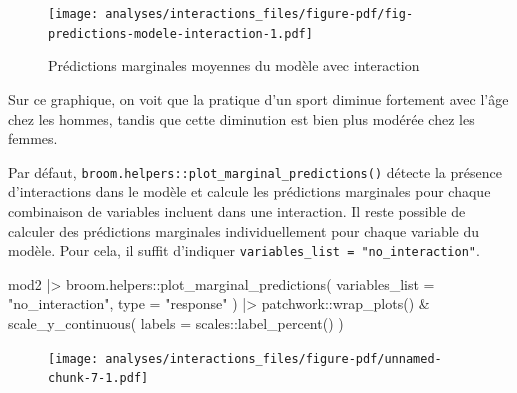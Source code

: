 \documentclass[
  letterpaper,
  DIV=11,
  numbers=noendperiod,
  oneside]{scrreprt}
\newenvironment{Shaded}{\begin{snugshade}}{\end{snugshade}}
\newcommand{\AttributeTok}[1]{\textcolor[rgb]{0.40,0.45,0.13}{#1}}
\newcommand{\FunctionTok}[1]{\textcolor[rgb]{0.28,0.35,0.67}{#1}}
\newcommand{\NormalTok}[1]{\textcolor[rgb]{0.00,0.23,0.31}{#1}}
\newcommand{\SpecialCharTok}[1]{\textcolor[rgb]{0.37,0.37,0.37}{#1}}
\newcommand{\StringTok}[1]{\textcolor[rgb]{0.13,0.47,0.30}{#1}}
\begin{document}
\begin{figure}[H]

{\centering \texttt{[image: analyses/interactions\_files/figure-pdf/fig-predictions-modele-interaction-1.pdf]}

}

\caption{\label{fig-predictions-modele-interaction}Prédictions
marginales moyennes du modèle avec interaction}

\end{figure}

Sur ce graphique, on voit que la pratique d'un sport diminue fortement
avec l'âge chez les hommes, tandis que cette diminution est bien plus
modérée chez les femmes.

\begin{tcolorbox}[enhanced jigsaw, colbacktitle=quarto-callout-tip-color!10!white, opacityback=0, toprule=.15mm, colback=white, coltitle=black, bottomtitle=1mm, toptitle=1mm, titlerule=0mm, rightrule=.15mm, title=\textcolor{quarto-callout-tip-color}{\faLightbulb}\hspace{0.5em}{Astuce}, breakable, bottomrule=.15mm, opacitybacktitle=0.6, arc=.35mm, left=2mm, leftrule=.75mm, colframe=quarto-callout-tip-color-frame]

Par défaut, \texttt{broom.helpers::plot\_marginal\_predictions()}
détecte la présence d'interactions dans le modèle et calcule les
prédictions marginales pour chaque combinaison de variables incluent
dans une interaction. Il reste possible de calculer des prédictions
marginales individuellement pour chaque variable du modèle. Pour cela,
il suffit d'indiquer \texttt{variables\_list\ =\ "no\_interaction"}.

\begin{Shaded}
\begin{Highlighting}[]
\NormalTok{mod2 }\SpecialCharTok{|\textgreater{}} 
\NormalTok{  broom.helpers}\SpecialCharTok{::}\FunctionTok{plot\_marginal\_predictions}\NormalTok{(}
    \AttributeTok{variables\_list =} \StringTok{"no\_interaction"}\NormalTok{,}
    \AttributeTok{type =} \StringTok{"response"}
\NormalTok{  ) }\SpecialCharTok{|\textgreater{}} 
\NormalTok{  patchwork}\SpecialCharTok{::}\FunctionTok{wrap\_plots}\NormalTok{() }\SpecialCharTok{\&}
  \FunctionTok{scale\_y\_continuous}\NormalTok{(}
    \AttributeTok{labels =}\NormalTok{ scales}\SpecialCharTok{::}\FunctionTok{label\_percent}\NormalTok{()}
\NormalTok{  )}
\end{Highlighting}
\end{Shaded}

\begin{figure}[H]

{\centering \texttt{[image: analyses/interactions\_files/figure-pdf/unnamed-chunk-7-1.pdf]}

}

\end{figure}

\end{tcolorbox}
\end{document}
